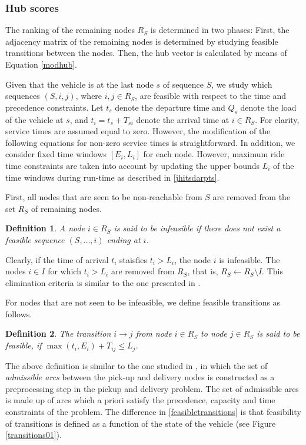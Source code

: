 \documentclass[dissertation,draft*]{aaltoseries}
\newtheorem*{definition}{Definition}
\begin{document}
\subsubsection{Hub scores}
\label{feasibility}
The ranking of the remaining nodes $R_S$ is determined in two phases: 
First, the adjacency matrix of the remaining nodes is determined by studying 
feasible transitions between the nodes.
Then, the hub vector is calculated by means of Equation \eqref{modhub}.

Given that the vehicle is at the last node $s$ of sequence $S$, we study which sequences $(S,i,j)$, where 
$i,j \in R_S$, are feasible with respect to the time and precedence constraints. %
Let $t_s$ denote the departure time and $Q_s$ denote the load of the vehicle at $s$, 
and $t_i = t_s + T_{si}$ denote the arrival time at $i \in R_S$. For clarity, service times are 
assumed equal to zero. However, the modification
of the following equations for non-zero service times is straightforward.
In addition, we consider %
fixed time windows $[E_i,L_i]$ for each node.
However, maximum ride time constraints \cite{hunsaker} are taken into account by updating the 
upper bounds $L_i$ of the time windows during run-time as described in \ref{jhitsdarpts}.

First, all nodes that are seen to be non-reachable from $S$ are removed from the set $R_S$ of remaining nodes.
\begin{definition}
 \label{linkki02}
A node $i \in R_S$ is said to be infeasible if
there does not exist a feasible sequence $(S,\ldots,i)$ ending at $i$.
\end{definition}
Clearly, if the time of arrival $t_i$ staisfies $t_i > L_i$, the node $i$ is infeasible.
The nodes $i \in I$ for which $t_i > L_i$ are removed from $R_S$, 
that is, $R_S \leftarrow R_S \setminus I$. This elimination criteria is similar to 
the one presented in \cite{desrosiers01}.

For nodes that are not seen to be infeasible, we define feasible transitions as follows.
\begin{definition}
\label{feasibletransitions}
The transition 
$i \to j$ from node $i \in R_S$ to node $j \in R_S$ is said to be \emph{feasible}, if 
$\max(t_i, E_i) + T_{ij} \leq L_j$. 
\end{definition}
The above definition is similar to the one studied in \cite{dumas03}, 
in which the set of \emph{admissible arcs} between the pick-up and delivery nodes is constructed
as a preprocessing step in the pickup and delivery problem. The set of admissible arcs is 
made up of arcs which a priori satisfy the precedence, capacity and time constraints of the problem.
The difference in \eqref{feasibletransitions} is that feasibility of 
transitions is defined as a function of the state of the vehicle (see Figure \ref{transitions01}).
\end{document}
